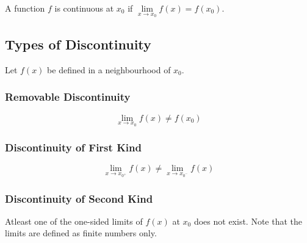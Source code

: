 \documentclass[fleqn]{article}
\begin{document}
A function $f$ is continuous at $x_0$ if $\lim\limits_{x \rightarrow x_0} f(x) = f(x_0)$.

\subsection{Types of Discontinuity}

Let $f(x)$ be defined in a neighbourhood of $x_0$. 

\subsubsection{Removable Discontinuity}

\begin{equation*}
	\lim\limits_{x \rightarrow x_0} f(x) \neq f(x_0)
\end{equation*}

\subsubsection{Discontinuity of First Kind}

\begin{equation*}
	\lim\limits_{x \rightarrow x_{0^+}} f(x) \neq \lim\limits_{x \rightarrow x_{0^-}} f(x)
\end{equation*}

\subsubsection{Discontinuity of Second Kind}

Atleast one of the one-sided limits of $f(x)$ at $x_0$ does not exist. Note that the limits are defined as finite numbers only. 
\end{document}
